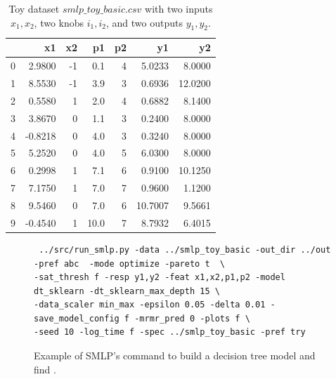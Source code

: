 \documentclass[a4paper,parskip=half]{article} %
\begin{document}
\begin{table}[t]
\centering\small
\begin{tabular}{lrrrrrr}
\hline %
{} &      x1 &  x2 &    p1 &  p2 &       y1 &       y2 \\
\hline %
0 &  2.9800 &  -1 &   0.1 &   4 &   5.0233 &   8.0000 \\
1 &  8.5530 &  -1 &   3.9 &   3 &   0.6936 &  12.0200 \\
2 &  0.5580 &   1 &   2.0 &   4 &   0.6882 &   8.1400 \\
3 &  3.8670 &   0 &   1.1 &   3 &   0.2400 &   8.0000 \\
4 & -0.8218 &   0 &   4.0 &   3 &   0.3240 &   8.0000 \\
5 &  5.2520 &   0 &   4.0 &   5 &   6.0300 &   8.0000 \\
6 &  0.2998 &   1 &   7.1 &   6 &   0.9100 &  10.1250 \\
7 &  7.1750 &   1 &   7.0 &   7 &   0.9600 &   1.1200 \\
8 &  9.5460 &   0 &   7.0 &   6 &  10.7007 &   9.5661 \\
9 & -0.4540 &   1 &  10.0 &   7 &   8.7932 &   6.4015 \\
\hline %
\end{tabular}
\caption{Toy dataset $smlp\_toy\_basic.csv$ with two inputs $x_1, x_2$, two knobs $i_1, i_2$, and two outputs $y_1, y_2$.}
\label{toy_basic_df}
\end{table}

\begin{figure}%
\begin{verbatim}
 ../src/run_smlp.py -data ../smlp_toy_basic -out_dir ../out -pref abc  -mode optimize -pareto t  \
-sat_thresh f -resp y1,y2 -feat x1,x2,p1,p2 -model dt_sklearn -dt_sklearn_max_depth 15 \
-data_scaler min_max -epsilon 0.05 -delta 0.01 -save_model_config f -mrmr_pred 0 -plots f \
-seed 10 -log_time f -spec ../smlp_toy_basic -pref try
\end{verbatim}
\caption{Example of SMLP's command to build a decision tree model and find .}
\label{fig:command}
\end{figure}
\end{document}
